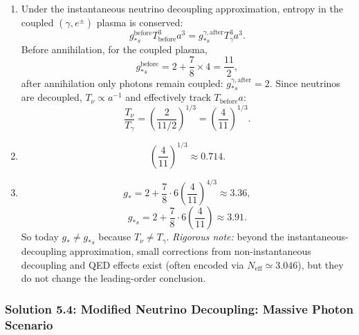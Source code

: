 \begin{enumerate}[label=(\alph*)]
  \item Under the instantaneous neutrino decoupling approximation, entropy in the coupled $(\gamma,e^\pm)$ plasma is conserved:
  \[
    g_{*s}^{\mathrm{before}}T_{\mathrm{before}}^3a^3
    = g_{*s}^{\gamma,\mathrm{after}}T_\gamma^3a^3.
  \]
  Before annihilation, for the coupled plasma,
  \[
    g_{*s}^{\mathrm{before}} = 2 + \frac{7}{8}\times 4 = \frac{11}{2},
  \]
  after annihilation only photons remain coupled: $g_{*s}^{\gamma,\mathrm{after}}=2$.
  Since neutrinos are decoupled, $T_\nu\propto a^{-1}$ and effectively track $T_{\mathrm{before}}a$:
  \[
    \frac{T_\nu}{T_\gamma} = \left(\frac{2}{11/2}\right)^{1/3} = \left(\frac{4}{11}\right)^{1/3}.
  \]

  \item
  \[
    \left(\frac{4}{11}\right)^{1/3} \approx 0.714.
  \]

  \item
  \[
    g_* = 2 + \frac{7}{8}\cdot 6\left(\frac{4}{11}\right)^{4/3} \approx 3.36,
  \]
  \[
    g_{*s} = 2 + \frac{7}{8}\cdot 6\left(\frac{4}{11}\right) \approx 3.91.
  \]
  So today $g_*\neq g_{*s}$ because $T_\nu\neq T_\gamma$.
  \textit{Rigorous note:} beyond the instantaneous-decoupling approximation, small corrections from non-instantaneous decoupling and QED effects exist (often encoded via $N_\mathrm{eff}\simeq 3.046$), but they do not change the leading-order conclusion.
\end{enumerate}

\subsubsection*{Solution 5.4: Modified Neutrino Decoupling: Massive Photon Scenario}

